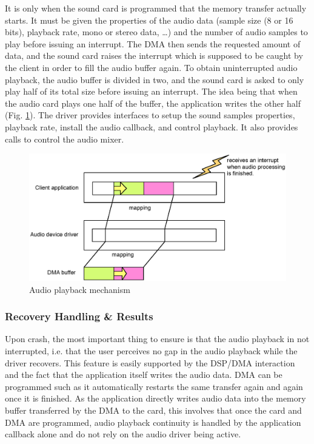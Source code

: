 \documentclass{report}
\begin{document}
It is only when the sound card is programmed that the memory transfer actually starts. It must be given the properties of the audio data (sample size (8 or 16 bits), playback rate, mono or stereo data, \ldots) and the number of audio samples to play before issuing an interrupt. The DMA then sends the requested amount of data, and the sound card raises the interrupt which is supposed to be caught by the client in order to fill the audio buffer again. To obtain uninterrupted audio playback, the audio buffer is divided in two, and the sound card is asked to only play half of its total size before issuing an interrupt. The idea being that when the audio card plays one half of the buffer, the application writes the other half (Fig. \ref{fig:audio_processing}). The driver provides interfaces to setup the sound samples properties, playback rate, install the audio callback, and control playback. It also provides calls to control the audio mixer.

\begin{figure}[ht]
\begin{center}
\includegraphics[scale=0.6]{audio_processing}
\caption{Audio playback mechanism}
\label{fig:audio_processing}
\end{center}
\end{figure}


\subsubsection{Recovery Handling \& Results}

Upon crash, the most important thing to ensure is that the audio playback in not interrupted, i.e. that the user perceives no gap in the audio playback while the driver recovers. This feature is easily supported by the DSP/DMA interaction and the fact that the application itself writes the audio data. DMA can be programmed such as it automatically restarts the same transfer again and again once it is finished. As the application directly writes audio data into the memory buffer transferred by the DMA to the card, this involves that once the card and DMA are programmed, audio playback continuity is handled by the application callback alone and do not rely on the audio driver being active.
\end{document}
